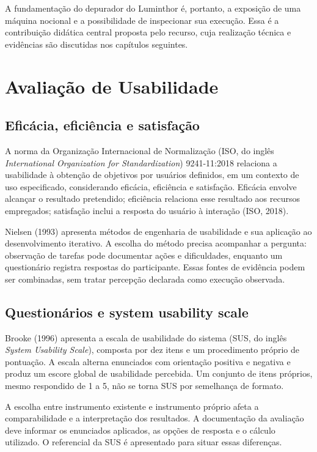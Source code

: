 \documentclass[
    12pt
    ,oneside
    ,a4paper
    ,chapter=TITLE
    ,section=TITLE
    ,sumario=abnt-6027-2012]{abntex2}
\begin{document}
A fundamentação do depurador do Luminthor é, portanto, a exposição de uma máquina
nocional e a possibilidade de inspecionar sua execução. Essa é a contribuição
didática central proposta pelo recurso, cuja realização técnica e evidências
são discutidas nos capítulos seguintes.

\section{Avaliação de Usabilidade}
\label{sec:fundamentos_usabilidade}

\subsection{Eficácia, eficiência e satisfação}
A norma da Organização Internacional de Normalização (ISO, do inglês
\textit{International Organization for Standardization}) 9241-11:2018 relaciona a usabilidade à obtenção de objetivos por usuários
definidos, em um contexto de uso especificado, considerando eficácia, eficiência
e satisfação. Eficácia envolve alcançar o resultado pretendido; eficiência
relaciona esse resultado aos recursos empregados; satisfação inclui a resposta
do usuário à interação (ISO, 2018).

Nielsen (1993) apresenta métodos de engenharia de usabilidade e sua aplicação
ao desenvolvimento iterativo. A escolha do método precisa acompanhar a pergunta:
observação de tarefas pode documentar ações e dificuldades, enquanto um
questionário registra respostas do participante. Essas fontes de evidência
podem ser combinadas, sem tratar percepção declarada como execução observada.

\subsection{Questionários e system usability scale}
Brooke (1996) apresenta a escala de usabilidade do sistema (SUS, do inglês \textit{System Usability Scale}), composta por
dez itens e um procedimento próprio de pontuação. A escala alterna enunciados
com orientação positiva e negativa e produz um escore global de usabilidade
percebida. Um conjunto de itens próprios, mesmo respondido de 1 a 5, não se
torna SUS por semelhança de formato.

A escolha entre instrumento existente e instrumento próprio afeta a
comparabilidade e a interpretação dos resultados. A documentação da avaliação
deve informar os enunciados aplicados, as opções de resposta e o cálculo
utilizado. O referencial da SUS é apresentado para situar essas diferenças.
\end{document}
